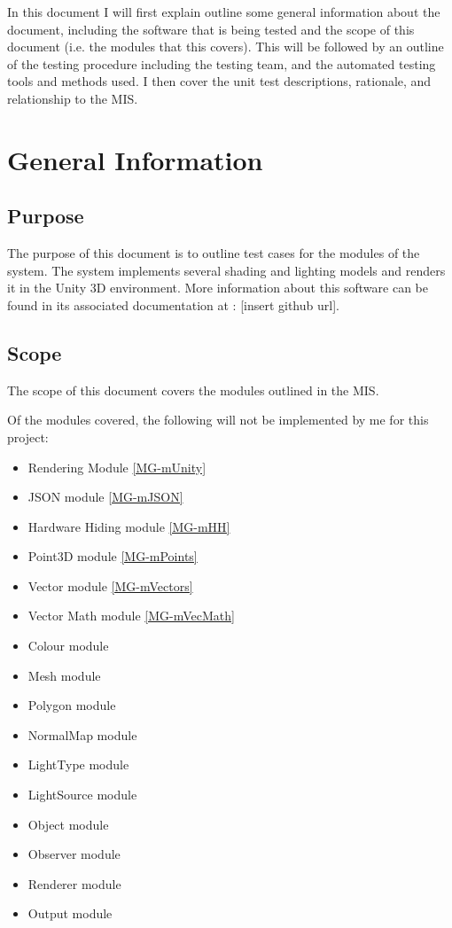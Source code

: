 \documentclass[12pt, titlepage]{article}
\begin{document}
In this document I will first explain outline some general information about 
the document, including the software that is being tested and the scope of this 
document (i.e. the modules that this covers). This will be followed by an 
outline of the testing procedure including the testing team, and the automated 
testing tools and methods used. I then cover the unit test descriptions, 
rationale, and relationship to the MIS.


\section{General Information}

\subsection{Purpose}
The purpose of this document is to outline test cases for the modules of the 
\progname system. The \progname system implements several shading and lighting 
models and renders it in the Unity 3D environment. More information about this 
software can be found in its associated documentation at : [insert github url].

\subsection{Scope}
The scope of this document covers the modules outlined in the MIS. 

Of the modules covered, the following will not be implemented by me for this 
project:

\begin{itemize}
	\item Rendering Module \ref{MG-mUnity}
	\item JSON module \ref{MG-mJSON}
	\item Hardware Hiding module \ref{MG-mHH}
	\item Point3D module \ref{MG-mPoints}
	\item Vector module \ref{MG-mVectors}
	\item Vector Math module \ref{MG-mVecMath}	
	\item Colour module
	\item Mesh module
	\item Polygon module
	\item NormalMap module
	\item LightType module
	\item LightSource module
	\item Object module
	\item Observer module
	\item Renderer module
	\item Output module
\end{itemize}
\end{document}
